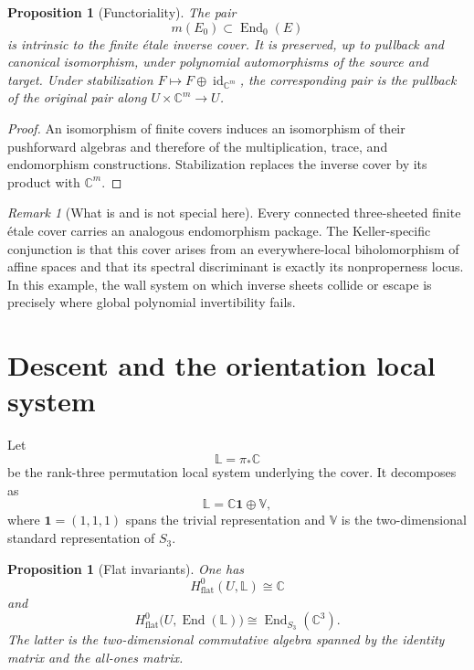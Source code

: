 \documentclass[11pt,reqno]{amsart}
\numberwithin{equation}{section}
\newtheorem{proposition}[theorem]{Proposition}
\theoremstyle{remark}
\newtheorem{remark}[theorem]{Remark}
\newcommand{\C}{\mathbb C}
\newcommand{\End}{\operatorname{End}}
\begin{document}
\begin{proposition}[Functoriality]\label{prop:functoriality}
The pair
\[
m(E_0)\subset\End_0(E)
\]
is intrinsic to the finite étale inverse cover. It is preserved, up to pullback and canonical isomorphism, under polynomial automorphisms of the source and target. Under stabilization $F\mapsto F\oplus\operatorname{id}_{\C^m}$, the corresponding pair is the pullback of the original pair along $U\times\C^m\to U$.
\end{proposition}

\begin{proof}
An isomorphism of finite covers induces an isomorphism of their pushforward algebras and therefore of the multiplication, trace, and endomorphism constructions. Stabilization replaces the inverse cover by its product with $\C^m$.
\end{proof}

\begin{remark}[What is and is not special here]
Every connected three-sheeted finite étale cover carries an analogous endomorphism package. The Keller-specific conjunction is that this cover arises from an everywhere-local biholomorphism of affine spaces and that its spectral discriminant is exactly its nonproperness locus. In this example, the wall system on which inverse sheets collide or escape is precisely where global polynomial invertibility fails.
\end{remark}

\section{Descent and the orientation local system}

Let
\[
\mathbb L=\pi_*\C
\]
be the rank-three permutation local system underlying the cover. It decomposes as
\begin{equation}\label{eq:perm-decomp}
\mathbb L
=
\C\mathbf1\oplus\mathbb V,
\end{equation}
where $\mathbf1=(1,1,1)$ spans the trivial representation and $\mathbb V$ is the two-dimensional standard representation of $S_3$.

\begin{proposition}[Flat invariants]\label{prop:flat-invariants}
One has
\[
H^0_{\mathrm{flat}}(U,\mathbb L)\cong\C
\]
and
\[
H^0_{\mathrm{flat}}\bigl(U,\End(\mathbb L)\bigr)
\cong
\End_{S_3}(\C^3).
\]
The latter is the two-dimensional commutative algebra spanned by the identity matrix and the all-ones matrix.
\end{proposition}
\end{document}
